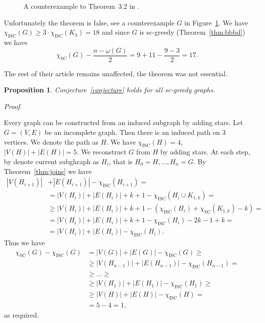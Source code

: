 \documentclass[11pt,a4paper]{article}
\theoremstyle{plain}
\newtheorem{prop}[thm]{Proposition}
\newenvironment{pf}{
  \par\medskip\noindent
  \textit{Proof}.
}{
\newline
\rightline{$\square$}  %
}
\theoremstyle{definition}
\theoremstyle{remark}
\newcommand{\scn}{\chi_\text{SC}}
\newcommand{\iscn}{\chi_\text{ISC}}
\begin{document}
\begin{figure}[h]
\centering
{}
\caption{A counterexample to Theorem~3.2 in \cite{iscn}.}
\label{fig:counterexample}
\end{figure}

Unfortunately the theorem is false, see a counterexample $G$ in Figure~\ref{fig:counterexample}. We have $\iscn(G) \geq 3\cdot\iscn(K_3) = 18$ and since $G$ is sc-greedy (Theorem~\ref{thm:bbbd}) we have $$\scn(G) - \frac{n-\omega(G)}{2} = 9 + 11 - \frac{9-3}{2} = 17.$$

The rest of their article remains unaffected, the theorem was not essential.

\begin{prop}\label{thm:scg}
Conjecture~\ref{conjecture} holds for all sc-greedy graphs.
\end{prop}

\begin{pf}
Every graph can be constructed from an induced subgraph by adding stars. Let $G=(V,E)$ be an incomplete graph. Then there is an induced path on 3 vertices. We denote the path as $H$. We have $\iscn(H)=4$, $|V(H)| + |E(H)| = 5$. We reconstruct $G$ from $H$ by adding stars. At each step, by denote current subghraph as $H_i$, that is $H_0=H,\ldots,H_n=G$. By Theorem~\ref{thm:joins} we have \begin{align*}
|V(H_{i+1})| &+ |E(H_{i+1})| - \iscn(H_{i+1}) = \\
&= |V(H_{i})| + |E(H_{i})| + k + 1 - \iscn(H_i \cup K_{1,k}) = \\
&\geq |V(H_{i})| + |E(H_{i})| + k + 1 - (\iscn(H_i) + \scn(K_{1,k}) - k) = \\
&= |V(H_{i})| + |E(H_{i})| + k + 1 - \iscn(H_i) - 2k - 1 + k = \\
&= |V(H_{i})| + |E(H_{i})| - \iscn(H_i).
\end{align*}
Thus we have
\begin{align*}
\scn(G) - \iscn(G) &= |V(G)| + |E(G)| - \iscn(G) \geq \\
	&\geq |V(H_{n-1})| + |E(H_{n-1})| - \iscn(H_{n-1}) = \\
	&\geq ... \geq \\
	&\geq |V(H_1)| + |E(H_1)| - \iscn(H_1) \geq \\
 	&\geq |V(H)| + |E(H)| - \iscn(H) = \\
 	&= 5 - 4 = 1,
\end{align*}
as required.
\end{pf}
\end{document}
